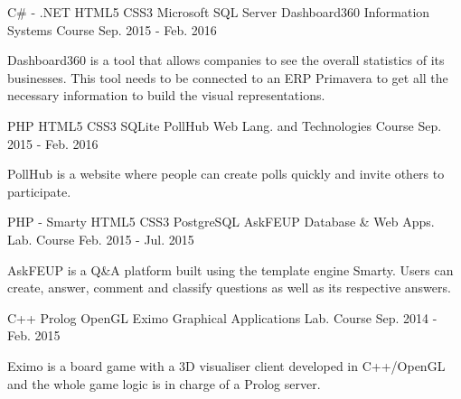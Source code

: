 \begin{cventries}
    \cventry
    {C\# - .NET \enskip\cdotp\enskip HTML5 \enskip\cdotp\enskip CSS3 \enskip\cdotp\enskip Microsoft SQL Server}
    {Dashboard360}
    {Information Systems Course}
    {Sep. 2015 - Feb. 2016}
    {
      \begin{cvitems}
        \item {Dashboard360 is a tool that allows companies to see the overall statistics of its businesses. This tool needs to be connected to an ERP Primavera to get all the necessary information to build the visual representations.}
      \end{cvitems}
    }
    
    \cventry
    {PHP \enskip\cdotp\enskip HTML5 \enskip\cdotp\enskip CSS3 \enskip\cdotp\enskip SQLite}
    {PollHub}
    {Web Lang. and Technologies Course}
    {Sep. 2015 - Feb. 2016}
    {
      \begin{cvitems}
        \item {PollHub is a website where people can create polls quickly and invite others to participate.}
      \end{cvitems}
    }
    
    \cventry
    {PHP - Smarty \enskip\cdotp\enskip HTML5 \enskip\cdotp\enskip CSS3 \enskip\cdotp\enskip PostgreSQL}
    {AskFEUP}
    {Database \& Web Apps. Lab. Course}
    {Feb. 2015 - Jul. 2015}
    {
      \begin{cvitems}
        \item {AskFEUP is a Q\&A platform built using the template engine Smarty. Users can create, answer, comment and classify questions as well as its respective answers.}
      \end{cvitems}
    }
    
    \cventry
    {C++ \enskip\cdotp\enskip Prolog \enskip\cdotp\enskip OpenGL}
    {Eximo}
    {Graphical Applications Lab. Course}
    {Sep. 2014 - Feb. 2015}
    {
      \begin{cvitems}
        \item {Eximo is a board game with a 3D visualiser client developed in C++/OpenGL and the whole game logic is in charge of a Prolog server.}
      \end{cvitems}
    }
     
\end{cventries}
